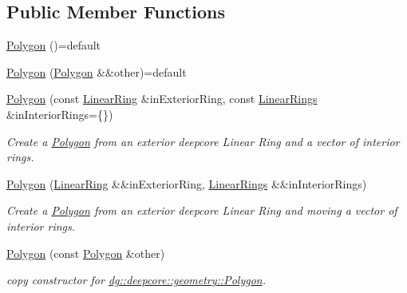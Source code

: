 \subsection*{Public Member Functions}
\begin{DoxyCompactItemize}
\item 
\hyperlink{structdg_1_1deepcore_1_1geometry_1_1_polygon_a47d0c9265675f286528aa75671d98a37}{Polygon} ()=default
\item 
\hyperlink{structdg_1_1deepcore_1_1geometry_1_1_polygon_af782bd379f30eeb0ffd99e844d54f582}{Polygon} (\hyperlink{structdg_1_1deepcore_1_1geometry_1_1_polygon}{Polygon} \&\&other)=default
\item 
\hyperlink{structdg_1_1deepcore_1_1geometry_1_1_polygon_a3c59621e26a3053263bca8055ea27acb}{Polygon} (const \hyperlink{structdg_1_1deepcore_1_1geometry_1_1_linear_ring}{Linear\+Ring} \&in\+Exterior\+Ring, const \hyperlink{namespacedg_1_1deepcore_1_1geometry_a30a8b05e06c4718edc95c06f0958576d}{Linear\+Rings} \&in\+Interior\+Rings=\{\})
\begin{DoxyCompactList}\small\item\em Create a \hyperlink{structdg_1_1deepcore_1_1geometry_1_1_polygon}{Polygon} from an exterior deepcore Linear Ring and a vector of interior rings. \end{DoxyCompactList}\item 
\hyperlink{structdg_1_1deepcore_1_1geometry_1_1_polygon_a789962512be1f61895748e6a919957cf}{Polygon} (\hyperlink{structdg_1_1deepcore_1_1geometry_1_1_linear_ring}{Linear\+Ring} \&\&in\+Exterior\+Ring, \hyperlink{namespacedg_1_1deepcore_1_1geometry_a30a8b05e06c4718edc95c06f0958576d}{Linear\+Rings} \&\&in\+Interior\+Rings)
\begin{DoxyCompactList}\small\item\em Create a \hyperlink{structdg_1_1deepcore_1_1geometry_1_1_polygon}{Polygon} from an exterior deepcore Linear Ring and moving a vector of interior rings. \end{DoxyCompactList}\item 
\hyperlink{structdg_1_1deepcore_1_1geometry_1_1_polygon_ae1a74c1b9850239b5a153aba4e268260}{Polygon} (const \hyperlink{structdg_1_1deepcore_1_1geometry_1_1_polygon}{Polygon} \&other)
\begin{DoxyCompactList}\small\item\em copy constructor for \hyperlink{structdg_1_1deepcore_1_1geometry_1_1_polygon}{dg\+::deepcore\+::geometry\+::\+Polygon}. \end{DoxyCompactList}\item 

\end{DoxyCompactItemize}
